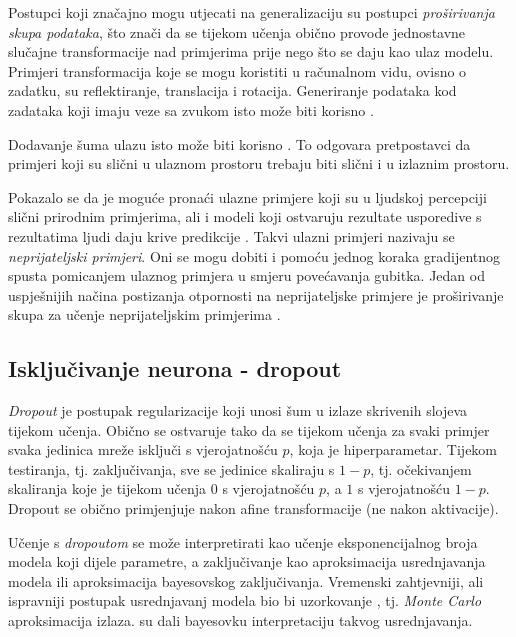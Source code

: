 \documentclass[utf8, diplomski, lmodern]{fer}
\begin{document}
Postupci koji značajno mogu utjecati na generalizaciju su postupci \emph{proširivanja skupa podataka}, što znači da se tijekom učenja obično provode jednostavne slučajne transformacije nad primjerima prije nego što se daju kao ulaz modelu. Primjeri transformacija koje se mogu koristiti u računalnom vidu, ovisno o zadatku, su reflektiranje, translacija i rotacija. Generiranje podataka kod zadataka koji imaju veze sa zvukom isto može biti korisno \cite{Goodfellow:2016:DL}.

Dodavanje šuma ulazu isto može biti korisno \citep{Goodfellow:2016:DL}. To odgovara pretpostavci da primjeri koji su slični u ulaznom prostoru trebaju biti slični i u izlaznim prostoru.

Pokazalo se da je moguće pronaći ulazne primjere koji su u ljudskoj percepciji slični prirodnim primjerima, ali i modeli koji ostvaruju rezultate usporedive s rezultatima ljudi daju krive predikcije \citep{Szegedy:2013:IPNN,Goodfellow:2014:EHAE}. Takvi ulazni primjeri nazivaju se \emph{neprijateljski primjeri}. Oni se mogu dobiti i pomoću jednog koraka gradijentnog spusta pomicanjem ulaznog primjera u smjeru povećavanja gubitka. Jedan od uspješnijih načina postizanja otpornosti na neprijateljske primjere je proširivanje skupa za učenje neprijateljskim primjerima \citep{Madry:2017:TDLMRAA}.

\subsection{Isključivanje neurona - dropout}

\emph{Dropout} \citep{Hinton:2012:INNPCAFD,Srivastava:2014:DASWPNNO} je postupak regularizacije koji unosi šum u izlaze skrivenih slojeva tijekom učenja. Obično se ostvaruje tako da se tijekom učenja za svaki primjer svaka jedinica mreže isključi s vjerojatnošću $p$, koja je hiperparametar. Tijekom testiranja, tj. zaključivanja, sve se jedinice skaliraju s $1-p$, tj. očekivanjem skaliranja koje je tijekom učenja $0$ s vjerojatnošću $p$, a $1$ s vjerojatnošću $1-p$. Dropout se obično primjenjuje nakon afine transformacije (ne nakon aktivacije).

Učenje s \textit{dropoutom} se može interpretirati kao učenje eksponencijalnog broja modela koji dijele parametre, a zaključivanje kao aproksimacija usrednjavanja modela ili aproksimacija bayesovskog zaključivanja. Vremenski zahtjevniji, ali ispravniji postupak usrednjavanj modela bio bi uzorkovanje \citep{Srivastava:2014:DASWPNNO}, tj. \textit{Monte Carlo} aproksimacija izlaza. \citet{Gal:2016:DBARMUDL} su dali bayesovku interpretaciju takvog usrednjavanja. 
\end{document}
